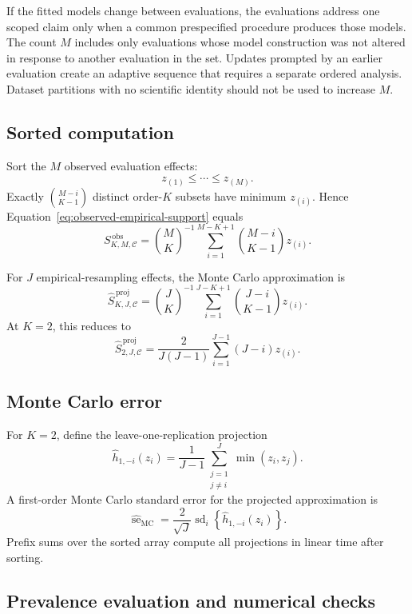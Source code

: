 \documentclass[11pt]{article}
\newcommand{\CSet}{\mathcal{C}}
\theoremstyle{remark}
\begin{document}
If the fitted models change between evaluations, the evaluations address one scoped claim only when a common prespecified procedure produces those models. The count $M$ includes only evaluations whose model construction was not altered in response to another evaluation in the set. Updates prompted by an earlier evaluation create an adaptive sequence that requires a separate ordered analysis. Dataset partitions with no scientific identity should not be used to increase $M$.

\subsection{Sorted computation}

Sort the $M$ observed evaluation effects:
\[
z_{(1)}\leq\cdots\leq z_{(M)}.
\]
Exactly $\binom{M-i}{K-1}$ distinct order-$K$ subsets have minimum
$z_{(i)}$. Hence Equation~\eqref{eq:observed-empirical-support} equals
\begin{equation}
S_{K,M,\CSet}^{\,\mathrm{obs}}
=
\binom{M}{K}^{-1}
\sum_{i=1}^{M-K+1}
\binom{M-i}{K-1}z_{(i)}.
\label{eq:sorted-observed}
\end{equation}

For $J$ empirical-resampling effects, the Monte Carlo approximation is
\begin{equation}
\widehat S_{K,J,\CSet}^{\,\mathrm{proj}}
=
\binom{J}{K}^{-1}
\sum_{i=1}^{J-K+1}
\binom{J-i}{K-1}z_{(i)}.
\label{eq:sorted-bootstrap}
\end{equation}
At $K=2$, this reduces to
\[
\widehat S_{2,J,\CSet}^{\,\mathrm{proj}}
=
\frac{2}{J(J-1)}
\sum_{i=1}^{J-1}(J-i)z_{(i)}.
\]

\subsection{Monte Carlo error}

For $K=2$, define the leave-one-replication projection
\[
\widehat h_{1,-i}(z_i)
=
\frac1{J-1}\sum_{\substack{j=1\\j\ne i}}^{J}\min(z_i,z_j).
\]
A first-order Monte Carlo standard error for the projected approximation is
\begin{equation}
\widehat{\operatorname{se}}_{\mathrm{MC}}
=
\frac2{\sqrt J}
\operatorname{sd}_{i}
\left\{
\widehat h_{1,-i}(z_i)
\right\}.
\label{eq:mcse}
\end{equation}
Prefix sums over the sorted array compute all projections in linear time after
sorting.

\subsection{Prevalence evaluation and numerical checks}
\end{document}

